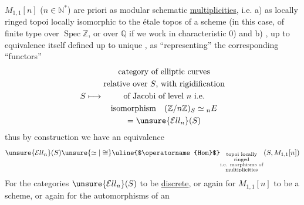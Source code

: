 $M_{1,1}[n]$ ($n\in\mathbb N^*$) are   priori as modular schematic \uline{multiplicities}, i.e. a) as locally ringed topoi locally isomorphic to the étale topos of a scheme (in this case, of finite type over $\operatorname{Spec}\mathbb Z$, or over $\mathbb Q$ if we work in characteristic 0) and b) , up to equivalence itself defined up to unique , as ``representing'' the  corresponding ``functors''
\[
S\longmapsto
\begin{gathered}
\text{category of elliptic curves}\\
\text{relative over }S\text{, with rigidification}\\
\text{of Jacobi of level }n\text{ i.e.}\\
\text{isomorphism}\quad(\mathbb Z/n\mathbb Z)_S\simeq{}_nE\\
={}\unsure{\mathcal{E}ll_n}(S)
\end{gathered}
\]
thus by construction we have  an equivalence
\[
\unsure{\mathcal{E}ll_n}(S)\unsure{\simeq|\cong}
\text{\uline{$\operatorname{Hom}$}}_{\substack{\text{topoi locally}\\\text{ringed}\\\text{i.e. morphisms of}\\\text{multiplicities}}}
(S,M_{1,1}[n])
\]
For the categories $\unsure{\mathcal{E}ll_n}(S)$ to be \uline{discrete},  or again for $M_{1,1}[n]$ to be a scheme, or again for the automorphisms of an


